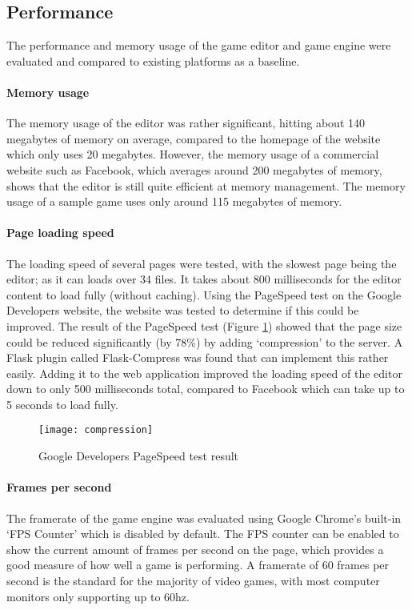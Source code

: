 	\subsection{Performance}
	The performance and memory usage of the game editor and game engine were evaluated and compared to existing platforms as a baseline.

	\paragraph{Memory usage}
	The memory usage of the editor was rather significant, hitting about 140 megabytes of memory on average, compared to the homepage of the website which only uses 20 megabytes. However, the memory usage of a commercial website such as Facebook, which averages around 200 megabytes of memory, shows that the editor is still quite efficient at memory management. The memory usage of a sample game uses only around 115 megabytes of memory.

	\paragraph{Page loading speed}
	The loading speed of several pages were tested, with the slowest page being the editor; as it can loads over 34 files. It takes about 800 milliseconds for the editor content to load fully (without caching). Using the PageSpeed test on the Google Developers website, the website was tested to determine if this could be improved. The result of the PageSpeed test (Figure \ref{fig:pagespeed}) showed that the page size could be reduced significantly (by 78\%) by adding `compression' to the server. A Flask plugin called Flask-Compress was found that can implement this rather easily. Adding it to the web application improved the loading speed of the editor down to only 500 milliseconds total, compared to Facebook which can take up to 5 seconds to load fully.


\begin{figure}[h]
	\centering
	\texttt{[image: compression]}
	\caption{Google Developers PageSpeed test result}
	\label{fig:pagespeed}
\end{figure}

	\paragraph{Frames per second}
	The framerate of the game engine was evaluated using Google Chrome's built-in `FPS Counter' which is disabled by default. The FPS counter can be enabled to show the current amount of frames per second on the page, which provides a good measure of how well a game is performing. A framerate of 60 frames per second is the standard for the majority of video games, with most computer monitors only supporting up to 60hz.

